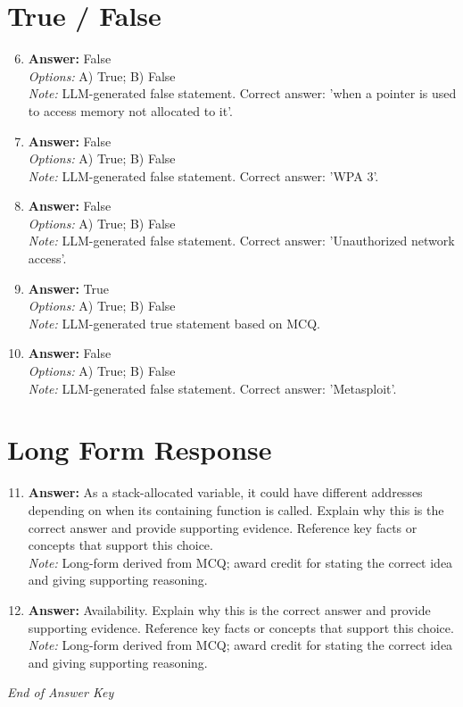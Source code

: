 \documentclass[12pt]{article}
\begin{document}
\section*{True / False}
\begin{enumerate}[label=\arabic*.]
\setcounter{enumi}{5}
\item \textbf{Answer:} False
\\ \textit{Options:} A) True; B) False
\\ \textit{Note:} LLM-generated false statement. Correct answer: 'when a pointer is used to access memory not allocated to it'.
\item \textbf{Answer:} False
\\ \textit{Options:} A) True; B) False
\\ \textit{Note:} LLM-generated false statement. Correct answer: 'WPA 3'.
\item \textbf{Answer:} False
\\ \textit{Options:} A) True; B) False
\\ \textit{Note:} LLM-generated false statement. Correct answer: 'Unauthorized network access'.
\item \textbf{Answer:} True
\\ \textit{Options:} A) True; B) False
\\ \textit{Note:} LLM-generated true statement based on MCQ.
\item \textbf{Answer:} False
\\ \textit{Options:} A) True; B) False
\\ \textit{Note:} LLM-generated false statement. Correct answer: 'Metasploit'.
\end{enumerate}

\section*{Long Form Response}
\begin{enumerate}[label=\arabic*.]
\setcounter{enumi}{10}
\item \textbf{Answer:} As a stack-allocated variable, it could have different addresses depending on when its containing function is called. Explain why this is the correct answer and provide supporting evidence. Reference key facts or concepts that support this choice.
\\ \textit{Note:} Long-form derived from MCQ; award credit for stating the correct idea and giving supporting reasoning.
\item \textbf{Answer:} Availability. Explain why this is the correct answer and provide supporting evidence. Reference key facts or concepts that support this choice.
\\ \textit{Note:} Long-form derived from MCQ; award credit for stating the correct idea and giving supporting reasoning.
\end{enumerate}

\vfill
\noindent\textit{End of Answer Key}
\end{document}
